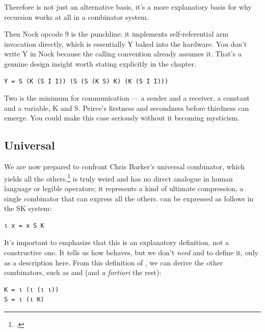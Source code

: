 \noindent
Therefore  is not just an alternative basis, it's a more explanatory basis for why recursion works at all in a combinator system.

Then Nock opcode 9 is the punchline: it implements self-referential arm invocation directly, which is essentially Y baked into the hardware. You don't write Y in Nock because the calling convention already assumes it. That's a genuine design insight worth stating explicitly in the chapter.

\begin{lstlisting}[style=listingcomb]
Y = S (K (S I I)) (S (S (K S) K) (K (S I I)))
\end{lstlisting}

Two is the minimum for communication — a sender and a receiver, a constant and a variable, K and S. Peirce's firstness and secondness before thirdness can emerge. You could make this case seriously without it becoming mysticism.

\subsection{ Universal}

We are now prepared to confront Chris Barker's universal  combinator, which yields all the others.\footnote{\href{https://web.archive.org/web/20160823182917/http://semarch.linguistics.fas.nyu.edu/barker/Iota/}{\citet{Barker2001}}.}   is truly weird and has no direct analogue in human language or legible operators; it represents a kind of ultimate compression, a single combinator that can express all the others.   can be expressed as follows in the \textsc{SK} system:

\begin{lstlisting}[style=listingcomb]
ι x = x S K
\end{lstlisting}

\noindent
It's important to emphasize that this is an explanatory definition, not a constructive one.  It tells us how  behaves, but we don't \emph{need}  and  to define it, only as a description here.  From this definition of , we can derive the other combinators, such as  and  (and \emph{a fortiori} the rest):

\begin{lstlisting}[style=listingcomb]
K = ι (ι (ι ι))
S = ι (ι K)
\end{lstlisting}

